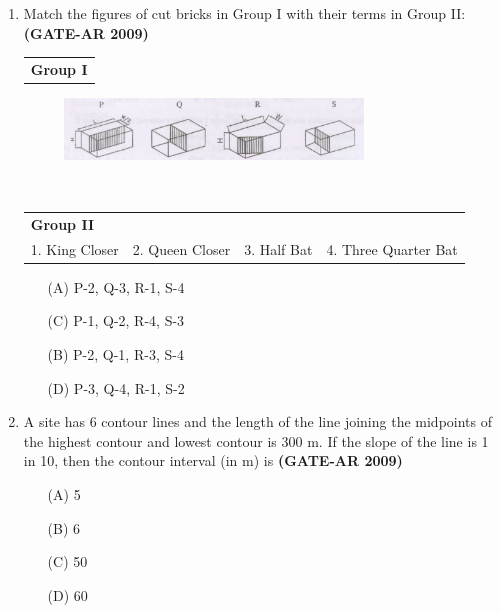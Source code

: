 \documentclass[a4paper,10pt]{article}
\begin{document}
\begin{enumerate}[label=Q.\arabic]
\newpage

    \item Match the figures of cut bricks in Group I with their terms in Group II: \textbf{(GATE-AR 2009)} \\
    \begin{tabular}{ l }
	\textbf{Group I} \\
	\end{tabular}
	\begin{figure}[h!]
        \centering
        \includegraphics[width=0.75\textwidth]{Pic01.jpg}
	\end{figure} \\
	\begin{tabular}{ l l l l }
	\textbf{Group II} & & & \\
	1. King Closer & 2. Queen Closer & 3. Half Bat & 4. Three Quarter Bat \\
	\end{tabular}
	\begin{multicols}{2}
	\begin{itemize}
        \item[(A)] P-2, Q-3, R-1, S-4
        \item[(C)] P-1, Q-2, R-4, S-3
        \item[(B)] P-2, Q-1, R-3, S-4
        \item[(D)] P-3, Q-4, R-1, S-2
    \end{itemize}
	\end{multicols}

    \item A site has 6 contour lines and the length of the line joining the midpoints of the highest contour and lowest contour is 300 m. If the slope of the line is 1 in 10, then the contour interval (in m) is \textbf{(GATE-AR 2009)}
    \begin{multicols}{4}
	\begin{itemize}
        \item[(A)] 5
        \item[(B)] 6
        \item[(C)] 50
        \item[(D)] 60
    \end{itemize}
	\end{multicols}
	

\end{enumerate}
\end{document}
